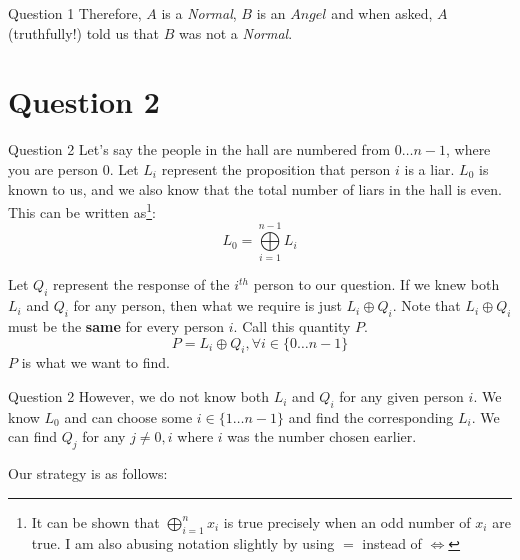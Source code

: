 \documentclass{beamer}
\begin{document}
{\begin{frame}{Question 1}
            Therefore, $A$ is a \textit{Normal}, $B$ is an $\textit{Angel}$ and when asked, $A$ (truthfully!) told us that $B$ was not a \textit{Normal}.
        \end{frame}
    }

    \section{Question 2}
    {
        \begin{frame}{Question 2}
            Let's say the people in the hall are numbered from $0 \dots n - 1$, where you are person $0$. Let $L_{i}$ represent the proposition that person $i$ is a liar. $L_{0}$ is known to us, and we also know that the total number of liars in the hall is even. This can be written as\footnote{It can be shown that $\bigoplus_{i = 1}^{n} x_{i}$ is true precisely when an odd number of $x_{i}$ are true. I am also abusing notation slightly by using $=$ instead of $\iff$}:
            \begin{equation*}
                L_{0} = \bigoplus\limits_{i = 1}^{n - 1} L_{i}
            \end{equation*}

            Let $Q_{i}$ represent the response of the $i^{th}$ person to our question. If we knew both $L_{i}$ and $Q_{i}$ for any person, then what we require is just $L_{i} \oplus Q_{i}$. Note that $L_{i} \oplus Q_{i}$ must be the \textbf{same} for every person $i$. Call this quantity $P$.
            \begin{equation*}
                P = L_{i} \oplus Q_{i}, \forall i \in \{0 \dots n - 1\}
            \end{equation*}
            $P$ is what we want to find.
        \end{frame}
        \begin{frame}{Question 2}
            However, we do not know both $L_{i}$ and $Q_{i}$ for any given person $i$. We know $L_{0}$ and can choose some $i \in \{1 \dots n - 1\}$ and find the corresponding $L_{i}$. We can find $Q_{j}$ for any $j \neq 0, i$ where $i$ was the number chosen earlier.
            
            Our strategy is as follows:


\end{frame}}
\end{document}
